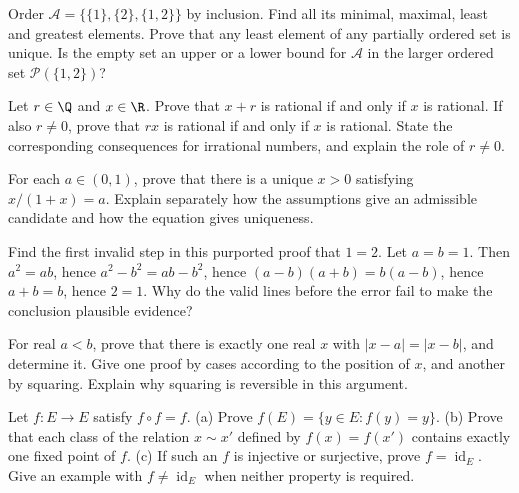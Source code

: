 \begin{exercise}[$\star\star$]\label{ex:lang-order}
Order $\mathcal A=\{\{1\},\{2\},\{1,2\}\}$ by inclusion. Find all its minimal,
maximal, least and greatest elements. Prove that any least element of any partially
ordered set is unique. Is the empty set an upper or a lower bound for $\mathcal A$
in the larger ordered set $\mathcal P(\{1,2\})$?
\end{exercise}

\begin{exercise}[$\star\star$]\label{ex:lang-rational}
Let $r\in\Q$ and $x\in\R$. Prove that $x+r$ is rational if and only if $x$ is rational.
If also $r\ne0$, prove that $rx$ is rational if and only if $x$ is rational.
State the corresponding consequences for irrational numbers, and explain the role of $r\ne0$.
\end{exercise}

\begin{exercise}[$\star\star$]\label{ex:lang-existence}
For each $a\in(0,1)$, prove that there is a unique $x>0$ satisfying
$x/(1+x)=a$. Explain separately how the assumptions give an admissible candidate
and how the equation gives uniqueness.
\end{exercise}

\begin{exercise}[$\star$]\label{ex:lang-falseproof}
Find the first invalid step in this purported proof that $1=2$. Let $a=b=1$.
Then $a^2=ab$, hence $a^2-b^2=ab-b^2$, hence
$(a-b)(a+b)=b(a-b)$, hence $a+b=b$, hence $2=1$.
Why do the valid lines before the error fail to make the conclusion plausible evidence?
\end{exercise}

\begin{exercise}[$\star\star$]\label{ex:lang-midpoint}
For real $a<b$, prove that there is exactly one real $x$ with
$|x-a|=|x-b|$, and determine it. Give one proof by cases according to the position
of $x$, and another by squaring. Explain why squaring is reversible in this argument.
\end{exercise}

\begin{exercise}[$\star\star\star$]\label{ex:lang-retraction}
Let $f:E\to E$ satisfy $f\circ f=f$.
(a) Prove $f(E)=\{y\in E:f(y)=y\}$.
(b) Prove that each class of the relation $x\sim x'$ defined by $f(x)=f(x')$
contains exactly one fixed point of $f$.
(c) If such an $f$ is injective or surjective, prove $f=\operatorname{id}_E$.
Give an example with $f\ne\operatorname{id}_E$ when neither property is required.
\end{exercise}

